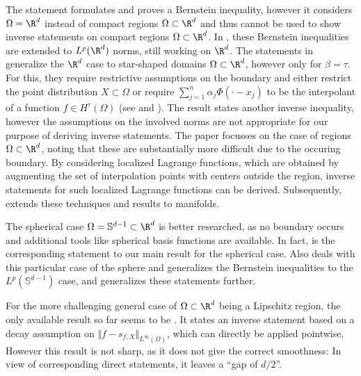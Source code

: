 \documentclass[a4paper, 10pt]{article}
\begin{document}
The statement \cite[Theorem 5.1]{narcowich2006sobolev} formulates and proves a Bernstein inequality,
however it considers $\Omega = \R^d$ instead of compact regions $\Omega \subset \R^d$ and thus cannot be used to show inverse statements on compact regions $\Omega \subset \R^d$.
In \cite{ward2012lp}, these Bernstein inequalities are extended to $L^p(\R^d)$ norms, still working on $\R^d$.
%
The statements in \cite[Section 6]{rieger2008sampling} generalize the $\R^d$ case to star-shaped domains $\Omega \subset \R^d$, 
however only for $\beta = \tau$.
For this, they require restrictive assumptions on the boundary and either restrict the point distribution $X \subset \Omega$  or require $\sum_{j=1}^n \alpha_j \Phi(\cdot - x_j)$ to be the interpolant of a function $f \in H^\tau(\Omega)$
(see \cite[Theorem 6.4.1]{rieger2008sampling} and \cite[Corollary 6.5.3]{rieger2008sampling}).
The result \cite[Lemma 3.2]{cheung2018convergence} states another inverse inequality,
however the assumptions on the involved norms are not appropriate for our purpose of deriving inverse statements.
The paper \cite{hangelbroek2018inverse} focusses on the case of regions $\Omega \subset \R^d$, noting that these are substantially more difficult due to the occuring boundary.
By considering localized Lagrange functions, which are obtained by augmenting the set of interpolation points with centers outside the region, 
inverse statements for such localized Lagrange functions can be derived.
Subsequently, \cite{hangelbroek2018direct} extends these techniques and results to manifolds.

%
The spherical case $\Omega = \mathbb{S}^{d-1} \subset \R^d$ is better researched, 
as no boundary occurs and additional tools like spherical basis functions are available.
In fact, \cite[Theorem 6.2]{narcowich2007direct} is the corresponding statement to our main result  for the spherical case.
Also \cite{mhaskar2010bernstein} deals with this particular case of the sphere and generalizes the Bernstein inequalities to the $L^p(\mathbb{S}^{d-1})$ case,
and \cite[Lemma 9.2]{mirzaei2018petrov} generalizes these statements further.

For the more challenging general case of $\Omega \subset \R^d$ being a Lipschitz region,
the only available result so far seems to be \cite[Theorem 6.1]{schaback2002inverse}.
It states an inverse statement based on a decay assumption on $\Vert f - s_{f, X} \Vert_{L^\infty(\Omega)}$,
which can directly be applied pointwise.
However this result is not sharp, as it does not give the correct smoothness: In view of corresponding direct statements, it leaves a ``gap of $d/2$''.
\end{document}
